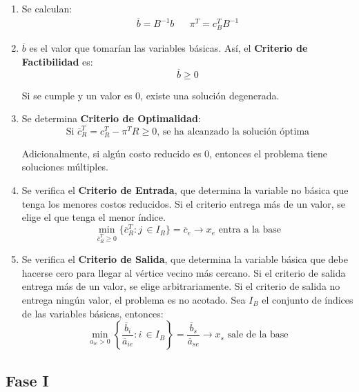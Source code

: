 \documentclass{article}
\begin{document}
\begin{enumerate}
    \item Se calculan:
    \begin{align*}
        \overline{b}=B^{-1}b && \pi^T = c_B^T B^{-1}
    \end{align*}
    \item $\overline{b}$ es el valor que tomarían las variables básicas. Así, el \textbf{Criterio de Factibilidad} es:
    \begin{equation*}
        \overline{b} \geq 0
    \end{equation*}

    Si se cumple y un valor es 0, existe una solución degenerada.
    \item Se determina \textbf{Criterio de Optimalidad}:
    \begin{equation*}
        \text{Si } \overline{c}_R^T=c_R^T - \pi^TR \geq 0 \text{, se ha alcanzado la solución óptima}
    \end{equation*}

    Adicionalmente, si algún costo reducido es $0$, entonces el problema tiene soluciones múltiples.
    \item Se verifica el \textbf{Criterio de Entrada}, que determina la variable no básica que tenga los menores costos reducidos. Si el criterio entrega más de un valor, se elige el que tenga el menor índice.
    \begin{equation*}
        \min_{\overline{c}_R^T \geq 0} \{\overline{c}_R^T:j\,\in I_R\} = \overline{c}_e \rightarrow x_e \text{ entra a la base}
    \end{equation*}
    \item Se verifica el \textbf{Criterio de Salida}, que determina la variable básica que debe hacerse cero para llegar al vértice vecino más cercano. Si el criterio de salida entrega más de un valor, se elige arbitrariamente. Si el criterio de salida no entrega ningún valor, el problema es no acotado. Sea $I_B$ el conjunto de índices de las variables básicas, entonces:
    \begin{equation*}
        \min_{a_{ie} > 0} \left\{\frac{\overline{b}_i}{\overline{a}_{ie}} : i\, \in I_B\right\} = \frac{\overline{b}_s}{\overline{a}_{se}} \rightarrow x_s \text{ sale de la base}
    \end{equation*}

\end{enumerate}
\subsection{Fase I}
\end{document}
